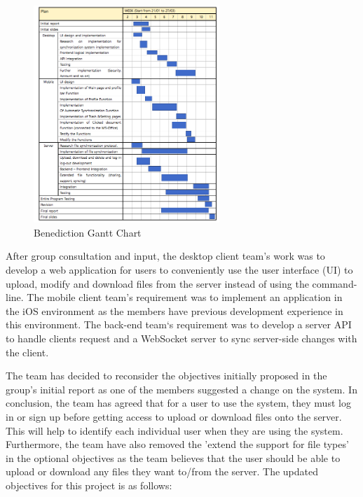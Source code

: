 \documentclass{article}
\begin{document}
\begin{figure}[H]
\begin{center}
\includegraphics[width=7cm]{timetable.png}
\end{center}
\caption{Benediction Gantt Chart}\label{ex4}
\end{figure}

After group consultation and input, the desktop client team’s work was to develop a web application for users to conveniently use the user interface (UI) to upload, modify and download files from the server instead of using the command-line. 
The mobile client team’s requirement was to implement an application in the iOS environment as the members have previous development experience in this environment. The back-end team‘s requirement was to develop a server API to handle clients request and a WebSocket server to sync server-side changes with the client. \newline

The team has decided to reconsider the objectives initially proposed in the group's initial report as one of the members suggested a change on the system. In conclusion, the team has agreed that for a user to use the system, they must log in or sign up before getting access to upload or download files onto the server. This will help to identify each individual user when they are using the system. Furthermore, the team have also removed the 'extend the support for file types' in the optional objectives as the team believes that the user should be able to upload or download any files they want to/from the server.
The updated objectives for this project is as follows:
\end{document}
